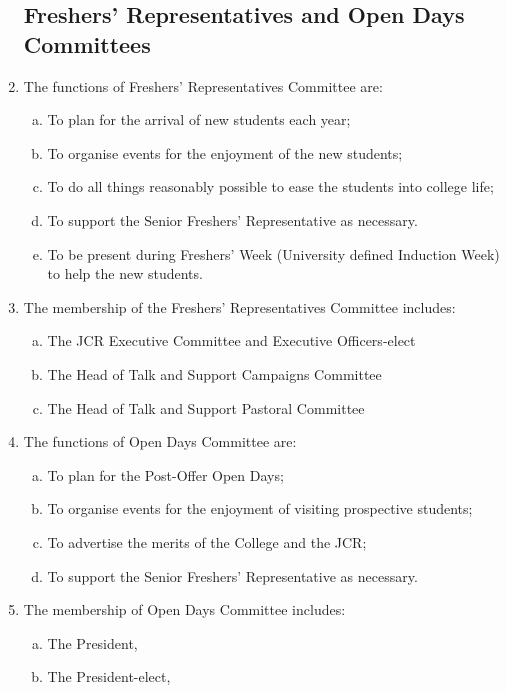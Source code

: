 \documentclass[12pt]{article}
\begin{document}
\begin{enumerate}
    \subsection{Freshers’ Representatives and Open Days Committees}
    \item The functions of Freshers’ Representatives Committee are:
    \begin{enumerate}[(a)]
        \item To plan for the arrival of new students each year;
        \item To organise events for the enjoyment of the new students;
        \item To do all things reasonably possible to ease the students into college life;
        \item To support the Senior Freshers’ Representative as necessary.
        \item To be present during Freshers’ Week (University defined Induction Week) to help the new students.
    \end{enumerate}
    \item The membership of the Freshers’ Representatives Committee includes:
    \begin{enumerate}[(a)]
        \item The JCR Executive Committee and Executive Officers-elect
        \item The Head of Talk and Support Campaigns Committee
        \item The Head of Talk and Support Pastoral Committee
    \end{enumerate}
    \item The functions of Open Days Committee are:
    \begin{enumerate}[(a)]
        \item To plan for the Post-Offer Open Days;
        \item To organise events for the enjoyment of visiting prospective students;
        \item To advertise the merits of the College and the JCR;
        \item To support the Senior Freshers’ Representative as necessary.
    \end{enumerate}
    \item The membership of Open Days Committee includes:
    \begin{enumerate}[(a)]
        \item The President,
        \item The President-elect,

\end{enumerate}
\end{enumerate}
\end{document}
